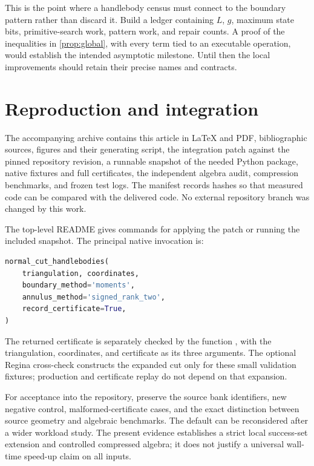 \documentclass[11pt,a4paper]{article}
\theoremstyle{definition}
\theoremstyle{remark}
\newcommand{\code}[1]{\texttt{\small\detokenize{#1}}}
\begin{document}
This is the point where a handlebody census must connect to the boundary
pattern rather than discard it. Build a ledger containing $L$, $g$, maximum
state bits, primitive-search work, pattern work, and repair counts. A proof
of the inequalities in \cref{prop:global}, with every term tied to an
executable operation, would establish the intended asymptotic milestone.
Until then the local improvements should retain their precise names and
contracts.

\section{Reproduction and integration}
\label{sec:reproduction}

The accompanying archive contains this article in \LaTeX{} and PDF,
bibliographic sources, figures and their generating script, the integration
patch against the pinned repository revision, a runnable snapshot of the
needed Python package, native fixtures and full certificates, the
independent algebra audit, compression benchmarks, and frozen test logs.
The manifest records hashes so that measured code can be compared with the
delivered code. No external repository branch was changed by this work.

The top-level README gives commands for applying the patch or running the
included snapshot. The principal native invocation is:
\begin{lstlisting}[language=Python]
normal_cut_handlebodies(
    triangulation, coordinates,
    boundary_method='moments',
    annulus_method='signed_rank_two',
    record_certificate=True,
)
\end{lstlisting}
The returned certificate is separately checked by the function
\code{verify_normal_cut_handlebodies}, with the triangulation, coordinates,
and certificate as its three arguments.
The optional Regina cross-check constructs the expanded cut only for these
small validation fixtures; production and certificate replay do not depend
on that expansion.

For acceptance into the repository, preserve the source bank identifiers,
new negative control, malformed-certificate cases, and the exact distinction
between source geometry and algebraic benchmarks. The default can be
reconsidered after a wider workload study. The present evidence establishes
a strict local success-set extension and controlled compressed algebra;
it does not justify a universal wall-time speed-up claim on all inputs.

\appendix
\end{document}
